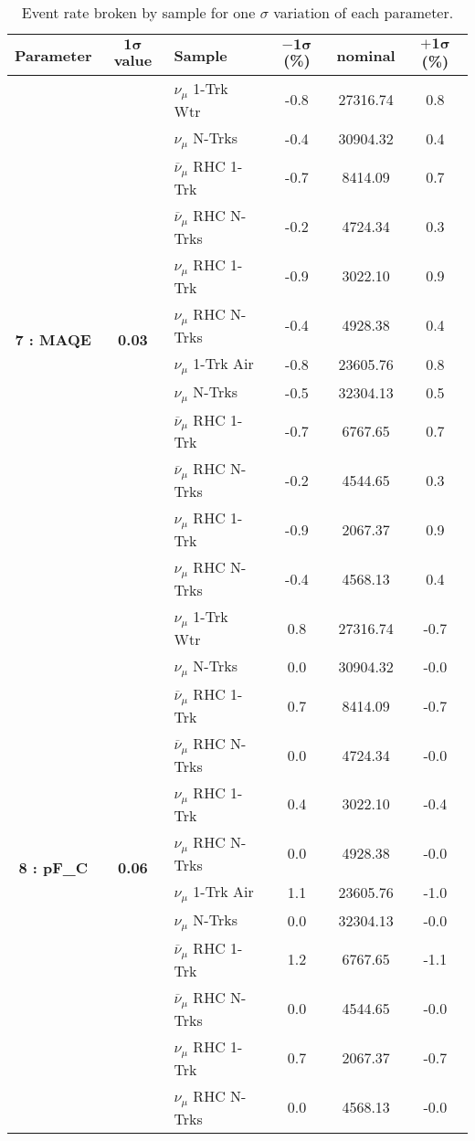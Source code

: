 \addtocounter{table}{-1}
\begin{table}[ht!]
\centering
\begin{tabular}{ c  c  l  c  c  c }
\midrule[1.3pt]
\textbf{Parameter} & \textbf{$\mathbf{1\sigma}$ value} & \textbf{Sample} & \textbf{$\mathbf{-1\sigma}$ (\%)}  &  \textbf{nominal}  &  \textbf{$\mathbf{+1\sigma}$ (\%)} \\
\midrule[1.3pt]
\multirow{12}{*}{\textbf{7 : MAQE}} & \multirow{12}{*}{\textbf{0.03}} & $\nu_\mu$ 1-Trk Wtr &   -0.8 &  27316.74 &   0.8 \\ 
 &  & $\nu_\mu$ N-Trks &   -0.4 &  30904.32 &   0.4 \\ 
 &  & $\overline{\nu}_\mu$ RHC 1-Trk &   -0.7 &  8414.09 &   0.7 \\ 
 &  & $\overline{\nu}_\mu$ RHC N-Trks &   -0.2 &  4724.34 &   0.3 \\ 
 &  & $\nu_\mu$ RHC 1-Trk &   -0.9 &  3022.10 &   0.9 \\ 
 &  & $\nu_\mu$ RHC N-Trks &   -0.4 &  4928.38 &   0.4 \\ 
 &  & $\nu_\mu$ 1-Trk Air &   -0.8 &  23605.76 &   0.8 \\ 
 &  & $\nu_\mu$ N-Trks &   -0.5 &  32304.13 &   0.5 \\ 
 &  & $\overline{\nu}_\mu$ RHC 1-Trk &   -0.7 &  6767.65 &   0.7 \\ 
 &  & $\overline{\nu}_\mu$ RHC N-Trks &   -0.2 &  4544.65 &   0.3 \\ 
 &  & $\nu_\mu$ RHC 1-Trk &   -0.9 &  2067.37 &   0.9 \\ 
 &  & $\nu_\mu$ RHC N-Trks &   -0.4 &  4568.13 &   0.4 \\ 
\midrule[1.3pt]
\multirow{12}{*}{\textbf{8 : pF\_C}} & \multirow{12}{*}{\textbf{0.06}} & $\nu_\mu$ 1-Trk Wtr &   0.8 &  27316.74 &   -0.7 \\ 
 &  & $\nu_\mu$ N-Trks &   0.0 &  30904.32 &   -0.0 \\ 
 &  & $\overline{\nu}_\mu$ RHC 1-Trk &   0.7 &  8414.09 &   -0.7 \\ 
 &  & $\overline{\nu}_\mu$ RHC N-Trks &   0.0 &  4724.34 &   -0.0 \\ 
 &  & $\nu_\mu$ RHC 1-Trk &   0.4 &  3022.10 &   -0.4 \\ 
 &  & $\nu_\mu$ RHC N-Trks &   0.0 &  4928.38 &   -0.0 \\ 
 &  & $\nu_\mu$ 1-Trk Air &   1.1 &  23605.76 &   -1.0 \\ 
 &  & $\nu_\mu$ N-Trks &   0.0 &  32304.13 &   -0.0 \\ 
 &  & $\overline{\nu}_\mu$ RHC 1-Trk &   1.2 &  6767.65 &   -1.1 \\ 
 &  & $\overline{\nu}_\mu$ RHC N-Trks &   0.0 &  4544.65 &   -0.0 \\ 
 &  & $\nu_\mu$ RHC 1-Trk &   0.7 &  2067.37 &   -0.7 \\ 
 &  & $\nu_\mu$ RHC N-Trks &   0.0 &  4568.13 &   -0.0 \\ 
\midrule[1.3pt]
\end{tabular}
\centering
\caption{Event rate broken by sample for one $\sigma$ variation of each parameter.}
\end{table}
